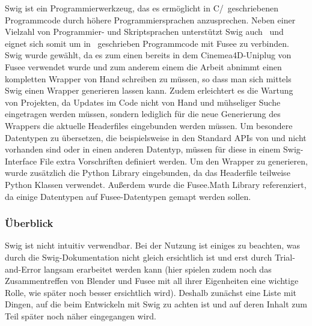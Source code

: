  \label{sec:umsetzung}



\label{sec:SWIG}

Swig ist ein Programmierwerkzeug, das es ermöglicht in C/\CC~geschriebenen Programmcode durch höhere Programmiersprachen anzusprechen. Neben einer Vielzahl von Programmier- und Skriptsprachen unterstützt Swig auch \CS~und eignet sich somit um in \CC~geschrieben Programmcode mit Fusee zu verbinden. Swig wurde gewählt, da es zum einen bereits in dem Cinemea4D-Uniplug von Fusee verwendet wurde und zum anderem einem die Arbeit abnimmt einen kompletten Wrapper von Hand schreiben zu müssen, so dass man sich mittels Swig einen Wrapper generieren lassen kann. Zudem erleichtert es die Wartung von Projekten, da Updates im Code nicht von Hand und mühseliger Suche eingetragen werden müssen, sondern lediglich für die neue Generierung des Wrappers die aktuelle Headerfiles eingebunden werden müssen. Um besondere Datentypen zu übersetzen, die beispielsweise in den Standard APIs von \CC und \CS nicht vorhanden sind oder in einen anderen Datentyp, müssen für diese in einem Swig-Interface File extra Vorschriften definiert werden.
Um den Wrapper zu generieren, wurde zusätzlich die Python Library eingebunden, da das Headerfile teilweise Python Klassen verwendet. Außerdem wurde die Fusee.Math Library referenziert, da einige Datentypen auf Fusee-Datentypen gemapt werden sollen.

\subsubsection{Überblick}
Swig ist nicht intuitiv verwendbar. Bei der Nutzung ist einiges zu beachten, was durch die Swig-Dokumentation nicht gleich ersichtlich ist und erst durch Trial-and-Error langsam erarbeitet werden kann (hier spielen zudem noch das Zusammentreffen von Blender und Fusee mit all ihrer Eigenheiten eine wichtige Rolle, wie später noch besser ersichtlich wird). Deshalb zunächst eine Liste mit Dingen, auf die beim Entwickeln mit Swig zu achten ist und auf deren Inhalt zum Teil später noch näher eingegangen wird.

